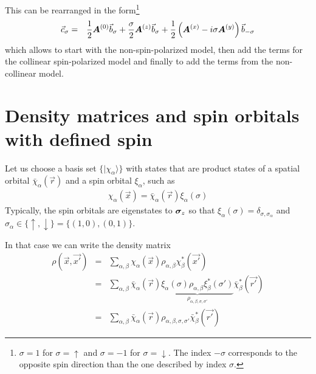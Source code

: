 \documentclass[11pt,a4paper]{report}
\begin{document}
This can be rearranged in the form\footnote{ $\sigma=1$ for
  $\sigma=\uparrow$ and $\sigma=-1$ for $\sigma=\downarrow$. The index
  $-\sigma$ corresponds to the opposite spin direction than the one
  described by index $\sigma$.}
\begin{eqnarray}
\vec{c}_\sigma&=&
\frac{1}{2}\bm{A}^{(0)}\vec{b}_\sigma
+\frac{\sigma}{2}\bm{A}^{(z)}\vec{b}_\sigma
+\frac{1}{2}\left(\bm{A}^{(x)}-i\sigma\bm{A}^{(y)}\right)\vec{b}_{-\sigma}
\end{eqnarray}
which allows to start with the non-spin-polarized model, then add the
terms for the collinear spin-polarized model and finally to add the
terms from the non-collinear model.







\section{Density matrices and spin orbitals with defined spin}
Let us choose a basis set $\{|\chi_\alpha\rangle\}$ with states that
are product states of a spatial orbital $\bar{\chi}_\alpha(\vec{r})$
and a spin orbital $\xi_\alpha$, such as
\begin{eqnarray}
\chi_\alpha(\vec{x})=\bar{\chi}_\alpha(\vec{r})\xi_\alpha(\sigma)
\label{eq:chiasproductofspaceandspin}
\end{eqnarray}
Typically, the spin orbitals are eigenstates to $\bm{\sigma}_z$ so
that $\xi_\alpha(\sigma)=\delta_{\sigma,\sigma_\alpha}$ and
$\sigma_\alpha\in\{\uparrow,\downarrow\}=\{(1,0),(0,1)\}$.

In that case we can write the density matrix
\begin{eqnarray}
\rho(\vec{x},\vec{x'})
&=&\sum_{\alpha,\beta}\chi_{\alpha}(\vec{x})\rho_{\alpha,\beta}\chi^*_{\beta}(\vec{x'})
\nonumber\\
&=&\sum_{\alpha,\beta}\bar{\chi}_{\alpha}(\vec{r})
\underbrace{\xi_\alpha(\sigma)\rho_{\alpha,\beta}\xi^*_\beta(\sigma')}
_{\rho_{\alpha,\beta,\sigma,\sigma'}}
\bar{\chi}^*_{\beta}(\vec{r'})
\nonumber\\
&=&\sum_{\alpha,\beta}\bar{\chi}_{\alpha}(\vec{r})\rho_{\alpha,\beta,\sigma,\sigma'}
\bar{\chi}^*_{\beta}(\vec{r'})
\label{eq:densitymatrixxxprimebyssigmaprime}
\end{eqnarray}
\end{document}
